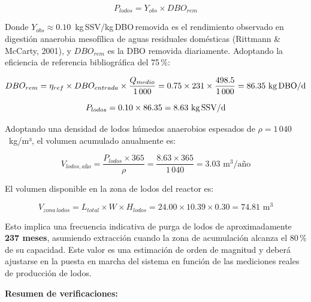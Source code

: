 \documentclass[12pt,a4paper]{article}
\begin{document}
\begin{equation}
P_{lodos} = Y_{obs} \times DBO_{rem}
\end{equation}

Donde $Y_{obs} \approx 0.10$~kg\,SSV/kg\,DBO\,removida es el rendimiento observado en digestión anaerobia mesofílica de aguas residuales domésticas (Rittmann \& McCarty, 2001), y $DBO_{rem}$ es la DBO removida diariamente. Adoptando la eficiencia de referencia bibliográfica del 75\,\%:

\begin{equation}
DBO_{rem} = \eta_{ref} \times DBO_{entrada} \times \frac{Q_{medio}}{1\,000} = 0.75 \times 231 \times \frac{498.5}{1\,000} = 86.35 \text{ kg\,DBO/d}
\end{equation}

\begin{equation}
P_{lodos} = 0.10 \times 86.35 = 8.63 \text{ kg\,SSV/d}
\end{equation}

Adoptando una densidad de lodos húmedos anaerobios espesados de $\rho = 1\,040$~kg/m³, el volumen acumulado anualmente es:

\begin{equation}
V_{lodos,año} = \frac{P_{lodos} \times 365}{\rho} = \frac{8.63 \times 365}{1\,040} = 3.03 \text{ m}^3\text{/año}
\end{equation}

El volumen disponible en la zona de lodos del reactor es:

\begin{equation}
V_{zona\,lodos} = L_{total} \times W \times H_{lodos} = 24.00 \times 10.39 \times 0.30 = 74.81 \text{ m}^3
\end{equation}

Esto implica una frecuencia indicativa de purga de lodos de aproximadamente \textbf{237 meses}, asumiendo extracción cuando la zona de acumulación alcanza el 80\,\% de su capacidad. Este valor es una estimación de orden de magnitud y deberá ajustarse en la puesta en marcha del sistema en función de las mediciones reales de producción de lodos.

\textbf{Resumen de verificaciones:}
\end{document}
